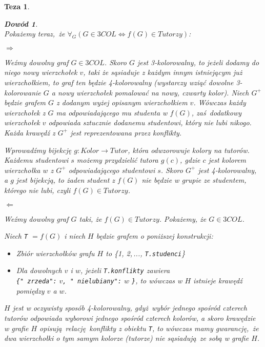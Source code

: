 \documentclass[12pt]{article}
\newtheorem*{theorem*}{Teza}
\newtheorem*{proof*}{Dowód}
\begin{document}
\begin{titlepage}
\begin{theorem*}
\begin{proof*}
$ $\\
Pokażemy teraz, że $\forall_G(G \in 3COL \Leftrightarrow f(G) \in Tutorzy)$:

$ $\\
$\Rightarrow$ 

Weźmy dowolny graf $G \in 3COL$. Skoro $G$ jest 3-kolorowalny, to jeżeli dodamy 
do niego nowy wierzchołek $v$, taki że sąsiaduje z każdym innym 
istniejącym już wierzchołkiem, to graf ten będzie 4-kolorowalny (wystarczy 
wziąć dowolne 3-kolorowanie $G$ a nowy wierzchołek pomalować na nowy, czwarty 
kolor). Niech $G^+$ będzie grafem $G$ z dodanym wyżej opisanym wierzchołkiem $v$.
Wówczas każdy wierzchołek z $G$ ma odpowiadającego mu studenta w $f(G)$, 
zaś dodatkowy wierzchołek $v$ odpowiada sztucznie dodanemu studentowi, który 
nie lubi nikogo. Każda krawędź z $G^+$ jest reprezentowana przez 
\textit{konflikty}. 

Wprowadźmy bijekcję $g : Kolor \rightarrow Tutor$, która odwzorowuje kolory na tutorów.
Każdemu studentowi $s$ możemy przydzielić tutora $g(c)$, gdzie $c$ jest 
kolorem wierzchołka $w$ z $G^+$ odpowiadającego studentowi $s$. Skoro $G^+$ 
jest 4-kolorowalny, a $g$ jest bijekcją, to żaden student z $f(G)$ nie będzie w grupie ze studentem, którego nie lubi, czyli $f(G) \in Tutorzy$.

$ $\\
$\Leftarrow$

Weźmy dowolny graf $G$ taki, że $f(G) \in Tutorzy$. Pokażemy, że $G \in 3COL$.


Niech \texttt{T} $= f(G)$ i niech $H$ będzie grafem o poniższej konstrukcji:
\begin{itemize}
    \item Zbiór wierzchołków grafu $H$ to \{1, 2,\,..., \texttt{T.studenci}\}
    \item Dla dowolnych $v$ i $w$, jeżeli \texttt{T.konflikty} zawiera \\
        \texttt{\{"\hskip0pt zrzeda":} $v$\texttt{, "\hskip0pt nielubiany":} 
        $w$ \texttt{\}}, to wówczas w $H$ istnieje krawędź pomiędzy $v$ a $w$.
\end{itemize}

$H$ jest w oczywisty sposób 4-kolorowalny, gdyż wybór jednego spośród czterech 
tutorów odpowiada wyborowi jednego spośród czterech kolorów, a skoro krawędzie 
w grafie $H$ opisują relację \textit{konflikty} z obiektu \texttt{T}, to 
wówczas mamy gwarancję, że dwa wierzchołki o tym samym kolorze (tutorze) nie 
sąsiadują ze sobą w grafie $H$.


\end{proof*}
\end{theorem*}
\end{titlepage}
\end{document}
